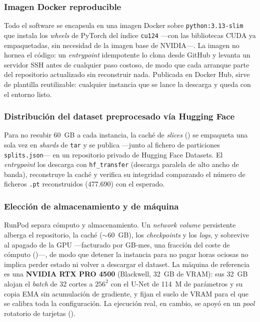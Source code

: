 \subsubsection{Imagen Docker reproducible}

Todo el software se encapsula en una imagen Docker sobre
\texttt{python:3.13-slim} que instala los \textit{wheels} de PyTorch del
índice \texttt{cu124} ---con las bibliotecas CUDA ya empaquetadas, sin
necesidad de la imagen base de NVIDIA---. La imagen no hornea el código:
un \textit{entrypoint} idempotente lo clona desde GitHub y levanta un
servidor SSH antes de cualquier paso costoso, de modo que cada arranque
parte del repositorio actualizado sin reconstruir nada. Publicada en
Docker Hub, sirve de plantilla reutilizable: cualquier instancia que se
lance la descarga y queda con el entorno listo.

\subsubsection{Distribución del dataset preprocesado vía Hugging Face}

Para no resubir 60~GB a cada instancia, la caché de \textit{slices}
() se empaqueta una sola vez en
\textit{shards} de \texttt{tar} y se publica ---junto al fichero de
particiones \texttt{splits.json}--- en un repositorio privado de Hugging
Face Datasets. El \textit{entrypoint} los descarga con
\texttt{hf\_transfer} (descarga paralela de alto ancho de banda),
reconstruye la caché y verifica su integridad comparando el número de
ficheros \texttt{.pt} reconstruidos (477.690) con el esperado.

\subsubsection{Elección de almacenamiento y de máquina}

RunPod separa cómputo y almacenamiento. Un \textit{network volume}
persistente alberga el repositorio, la caché ($\sim 60$~GB), los
\textit{checkpoints} y los \textit{logs}, y sobrevive al apagado de la
GPU ---facturado por GB-mes, una fracción del coste de cómputo
()---, de modo que detener la instancia para no
pagar horas ociosas no implica perder estado ni volver a descargar el
dataset. La máquina de referencia es una \textbf{NVIDIA RTX PRO 4500}
(Blackwell, 32~GB de VRAM): sus 32~GB alojan el \textit{batch} de 32
cortes a $256^2$ con el U-Net de 114~M de parámetros y su copia EMA sin
acumulación de gradiente, y fijan el suelo de VRAM para el que se calibra
toda la configuración. La ejecución real, en cambio, se apoyó en un
\textit{pool} rotatorio de tarjetas ().

